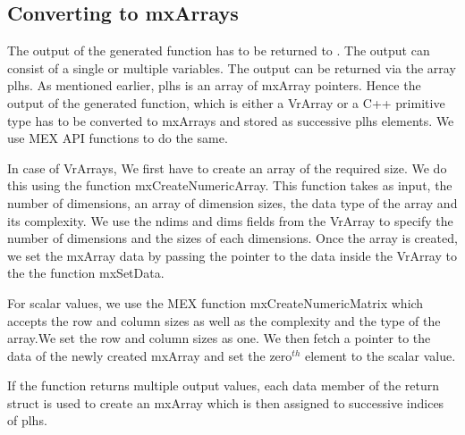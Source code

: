 \subsection{Converting to mxArrays}
The output of the generated function has to be returned to \matlab. The output can consist of a single or multiple variables. The output can be returned via the array plhs. As mentioned earlier, plhs is an array of mxArray pointers. Hence the output of the generated function, which is either a VrArray or a C++ primitive type has to be converted to mxArrays and stored as successive plhs elements. We use MEX API functions to do the same. 

In case of VrArrays, We first have to create an array of the required size. We do this using the function mxCreateNumericArray. This function takes as input, the number of dimensions, an array of dimension sizes, the data type of the array and its complexity. We use the ndims and dims fields from the VrArray to specify the number of dimensions and the sizes of each dimensions. Once the array is created, we set the mxArray data by passing the pointer to the data inside the VrArray to the the function mxSetData.

For scalar values, we use the MEX function mxCreateNumericMatrix which accepts the row and column sizes as well as the complexity and  the type of the array.We set the row and column sizes as one. We then fetch a pointer to the data of the newly created mxArray and set the zero$^{th}$ element to the scalar value. 

If the function returns multiple output values, each data member of the return struct is used to create an mxArray which is then assigned to successive indices of plhs. 
